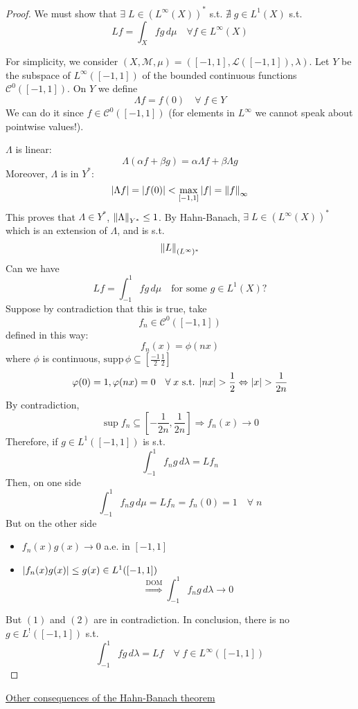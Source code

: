 \begin{proof}
    We must show that \(\exists \; L \in (L^\infty(X))^*\) s.t. \(\nexists \; g \in L^1(X)\) s.t. 
    \[
        Lf = \int_X fg \, d\mu \quad \forall f \in L^\infty(X)
    \]

For simplicity, we consider \((X, \mathcal{M}, \mu) = ([-1, 1], \mathcal{L}([-1,1]), \lambda)\). Let \(Y\) be the subspace of \(L^\infty([-1,1])\) of the bounded continuous functions \(\mathcal{C}^0([-1,1])\). On \(Y\) we define 
\[
    \Lambda f = f(0) \quad \forall \; f \in Y
\]
We can do it since \(f \in \mathcal{C}^0([-1,1])\) (for elements in \(L^\infty\) we cannot speak about pointwise values!). 

\(\Lambda\) is linear:
\[
    \Lambda(\alpha f + \beta g) = \alpha \Lambda f + \beta \Lambda g
\]
Moreover, \(\Lambda\) is in \(Y^*\):
\[
    \abs{\Lambda f} = \abs{f(0)} < \max_{[-1,1]} \abs{f} = \norm{f}_{\infty}
\]
This proves that \(\Lambda \in Y^*\), \(\norm{\Lambda}_{Y^*} \leq 1\). By Hahn-Banach, \(\exists \; L \in (L^\infty(X))^*\) which is an extension of \(\Lambda\), and is s.t. 
\[
    \norm{L}_{(L^\infty)^*}
\]
Can we have 
\[
    Lf=\int_{-1}^1 fg \, d\mu \quad \mbox{for some } g \in L^1(X)\mbox{?}
\]
Suppose by contradiction that this is true, take 
\[
    f_n \in \mathcal{C}^0([-1,1])
\]
defined in this way:
\[
    f_n(x) = \phi(nx)
\]
where \(\phi\) is continuous, \(\mbox{supp}\, \phi \subseteq \left[ \frac{-1}{2} \frac{1}{2} \right]\) 
\[
    \varphi(0) = 1, \varphi(nx) = 0 \quad \forall \; x \mbox{ s.t. } \abs{nx} > \frac{1}{2} \Leftrightarrow \abs{x} > \frac{1}{2n}  
\]
By contradiction, 
\[
    \sup f_n \subseteq \left[-\frac{1}{2n}, \frac{1}{2n}\right] \Rightarrow f_n(x) \to 0
\]
Therefore, if \(g \in L^1([-1,1])\) is s.t. 
\[
    \int_{-1}^1 f_n g \, d\lambda = L f_n
\]
Then, on one side 
\[
    \int_{-1}^1 f_n g \, d\mu = L f_n = f_n (0) = 1 \quad \forall \; n
\tag*{(1)}\]
But on the other side 
\begin{itemize}
    \item \(f_n(x)g(x) \to 0\) a.e. in \([-1,1]\)
    \item \(\abs{f_n(x) g(x)} \leq g(x) \in L^1([-1,1])\)
    \[
        \overset{\mbox{DOM}}{\Rightarrow} \int_{-1}^1 f_n g \, d\lambda \to 0
    \tag*{(2)}\]
\end{itemize}
But \((1)\) and \((2)\) are in contradiction.
In conclusion, there is no \(g \in L^!([-1,1])\) s.t. 
\[
    \int_{-1}^1 f g \, d\lambda = L f \quad \forall \; f \in L^\infty ([-1,1])
\]
\end{proof}
\underline{Other consequences of the Hahn-Banach theorem}
